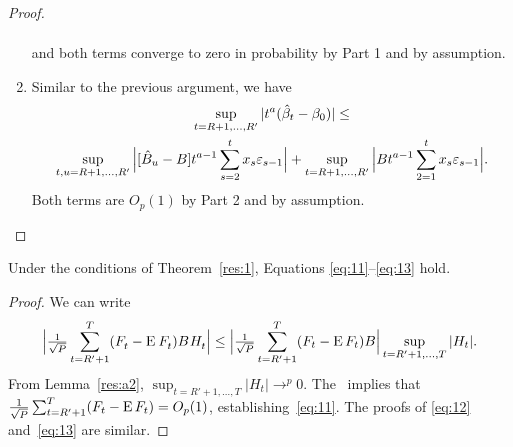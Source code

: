 \documentclass[12pt,fleqn]{article}
\newcommand{\WesA}[1][]{\ocltb{t}
  (F_t^{#1} - \E^{#1} F_t^{#1}) B^{#1} H_t^{#1}}
\begin{document}
\begin{proof}
\begin{enumerate}
\begin{multline*}
    \end{multline*}
    and both terms converge to zero in probability by Part 1 and by
    assumption.
  \item Similar to the previous argument, we have
    \begin{multline*}
      \sup_{t=R+1,\dots,R'} | t^a (\hat{\beta}_t - \btrue) | \leq \\
      \sup_{t,u =R+1,\dots,R'} \Big| [ \hat{B}_u - B]
      t^{a-1} \sum_{s=2}^t x_s \ep_{s-1} \Big| + \sup_{t = R+1,\dots,R'} \Big|
      B t^{a-1} \sum_{2=1}^t x_s \ep_{s-1} \Big|.
    \end{multline*}
    Both terms are $O_p(1)$ by Part 2 and by assumption. \qedhere
  \end{enumerate}
\end{proof}

\begin{alem}\label{res:a4}
  Under the conditions of Theorem~\ref{res:1}, Equations
  \eqref{eq:11}--\eqref{eq:13} hold.
\end{alem}

\begin{proof}
We can write
\begin{equation*}
  \Big\lvert \WesA \Big\rvert \leq
  \Big\lvert \ocltb{t} (F_t - \E F_t) B \Big\rvert
  \sup_{t = R'+1,\dots,T} | H_t |.
\end{equation*}
From Lemma~\ref{res:a2}, $\sup_{t = R'+1,\dots,T} | H_t | \to^p 0$. The \clt\ implies
that $\tfrac{1}{\sqrt{P}} \sum_{t=R'+1}^T (F_t - \operatorname{E} F_t) = O_p(1)$,
establishing~\eqref{eq:11}. The proofs of \eqref{eq:12}
and~\eqref{eq:13} are similar.
\end{proof}


\end{document}
